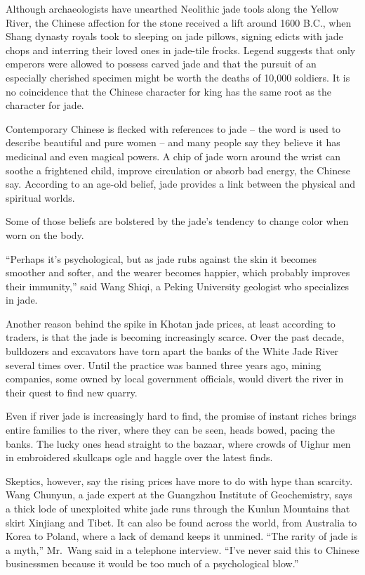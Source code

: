 ﻿\documentclass[12pt]{article}
\begin{document}
Although archaeologists have unearthed Neolithic jade tools along the Yellow River, the Chinese
affection for the stone received a lift around 1600 B.C., when Shang dynasty royals took to sleeping
on jade pillows, signing edicts with jade chops and interring their loved ones in jade-tile frocks.
Legend suggests that only emperors were allowed to possess carved jade and that the pursuit of an
especially cherished specimen might be worth the deaths of 10,000 soldiers. It is no coincidence
that the Chinese character for king has the same root as the character for jade.

Contemporary Chinese is flecked with references to jade -- the word is used to describe beautiful
and pure women -- and many people say they believe it has medicinal and even magical powers. A chip
of jade worn around the wrist can soothe a frightened child, improve circulation or absorb bad
energy, the Chinese say. According to an age-old belief, jade provides a link between the physical
and spiritual worlds.

Some of those beliefs are bolstered by the jade's tendency to change color when worn on the body.

``Perhaps it's psychological, but as jade rubs against the skin it becomes smoother and softer, and
the wearer becomes happier, which probably improves their immunity,'' said Wang Shiqi, a Peking
University geologist who specializes in jade.

Another reason behind the spike in Khotan jade prices, at least according to traders, is that the
jade is becoming increasingly scarce. Over the past decade, bulldozers and excavators have torn
apart the banks of the White Jade River several times over. Until the practice was banned three
years ago, mining companies, some owned by local government officials, would divert the river in
their quest to find new quarry.

Even if river jade is increasingly hard to find, the promise of instant riches brings entire
families to the river, where they can be seen, heads bowed, pacing the banks. The lucky ones head
straight to the bazaar, where crowds of Uighur men in embroidered skullcaps ogle and haggle over the
latest finds.

Skeptics, however, say the rising prices have more to do with hype than scarcity. Wang Chunyun, a
jade expert at the Guangzhou Institute of Geochemistry, says a thick lode of unexploited white jade
runs through the Kunlun Mountains that skirt Xinjiang and Tibet. It can also be found across the
world, from Australia to Korea to Poland, where a lack of demand keeps it unmined. ``The rarity of
jade is a myth,'' Mr.~Wang said in a telephone interview. ``I've never said this to Chinese
businessmen because it would be too much of a psychological blow.''
\end{document}
